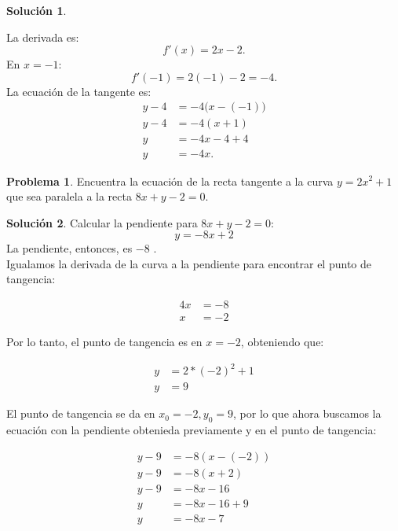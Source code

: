 \documentclass{article}
\theoremstyle{definition}
\newtheorem{problem}{Problema}
\newtheorem*{solution}{Solución}
\begin{document}
\begin{solution}
\begin{center}
\end{center}

La derivada es:
\[
f'(x)=2x-2.
\]
En \( x=-1 \):
\[
f'(-1)=2(-1)-2=-4.
\]
La ecuación de la tangente es:
\begin{align*}
y-4 &= -4\bigl(x-(-1)\bigr)\\
y-4 &= -4(x+1)\\
y &= -4x-4+4\\
y &= -4x.
\end{align*}
\end{solution}

\bigskip

\begin{problem}
Encuentra la ecuación de la recta tangente a la curva \( y = 2x^2 + 1 \) que sea paralela a la recta \( 8x + y - 2 = 0 \).
\end{problem}

\begin{solution}
Calcular la pendiente para \( 8x + y - 2 = 0 \):
\[
    y = -8x + 2
\]
La pendiente, entonces, es \( -8 \) . \\

Igualamos la derivada de la curva a la pendiente para encontrar el punto de tangencia:

\begin{align*}
    4x &= - 8 \\
    x &= - 2
\end{align*}

Por lo tanto, el punto de tangencia es en \( x = -2 \), obteniendo que:

\begin{align*}
    y &= 2*(-2)^2+1 \\
    y &= 9
\end{align*}

El punto de tangencia se da en \( x_0=-2, y_0=9\), por lo que ahora buscamos la ecuación con la pendiente obtenieda previamente y en el punto de tangencia:

\begin{align*}
    y - 9 &= -8(x-(-2)) \\
    y - 9 &= -8(x+2) \\
    y - 9 &= -8x - 16 \\
    y &= -8x - 16 + 9 \\
    y &= -8x - 7
\end{align*}
\end{solution}
\end{document}
